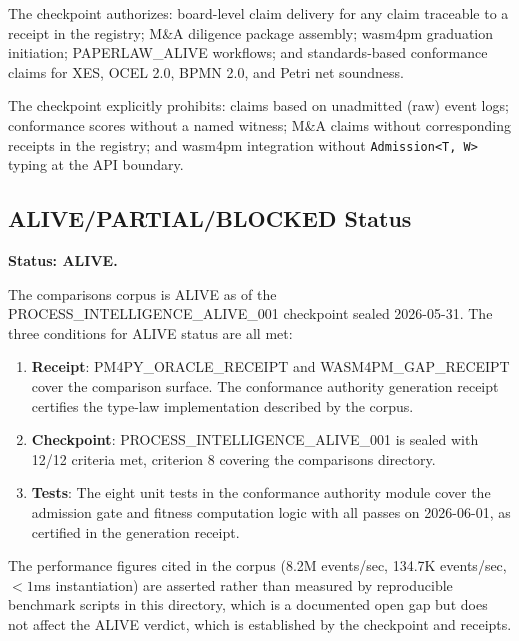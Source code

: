 The checkpoint authorizes: board-level claim delivery for any claim traceable to
a receipt in the registry; M\&A diligence package assembly; wasm4pm graduation
initiation; PAPERLAW\_ALIVE workflows; and standards-based conformance claims for
XES, OCEL 2.0, BPMN 2.0, and Petri net soundness.

The checkpoint explicitly prohibits: claims based on unadmitted (raw) event logs;
conformance scores without a named witness; M\&A claims without corresponding
receipts in the registry; and wasm4pm integration without \texttt{Admission<T, W>}
typing at the API boundary.

\subsection{ALIVE/PARTIAL/BLOCKED Status}
\label{sec:comparisons-evidence-status}

\textbf{Status: ALIVE.}

The comparisons corpus is ALIVE as of the PROCESS\_INTELLIGENCE\_ALIVE\_001
checkpoint sealed 2026-05-31. The three conditions for ALIVE status are all met:

\begin{enumerate}
  \item \textbf{Receipt}: PM4PY\_ORACLE\_RECEIPT and WASM4PM\_GAP\_RECEIPT cover
    the comparison surface. The conformance authority generation receipt certifies
    the type-law implementation described by the corpus.
  \item \textbf{Checkpoint}: PROCESS\_INTELLIGENCE\_ALIVE\_001 is sealed with
    12/12 criteria met, criterion 8 covering the comparisons directory.
  \item \textbf{Tests}: The eight unit tests in the conformance authority module
    cover the admission gate and fitness computation logic with all passes on
    2026-06-01, as certified in the generation receipt.
\end{enumerate}

The performance figures cited in the corpus (8.2M events/sec, 134.7K events/sec,
$< 1$ms instantiation) are asserted rather than measured by reproducible benchmark
scripts in this directory, which is a documented open gap but does not affect
the ALIVE verdict, which is established by the checkpoint and receipts.
